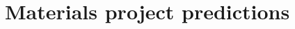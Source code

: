 \documentclass[twoside, english, notitlepage, 12pt]{uiofysmaster}
\begin{document}
    \part{Materials project predictions}




        \nocite{*}
        \printbibliography%
\end{document}
